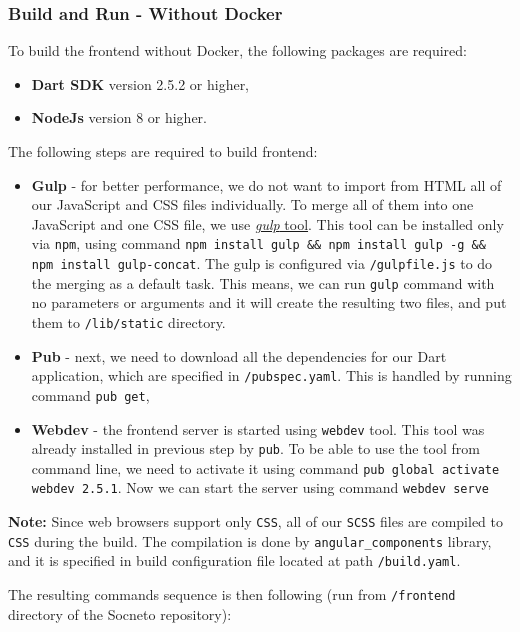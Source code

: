 \subsubsection {Build and Run - Without Docker}\label{section:frontend-build-no-docker}
To build the frontend without Docker, the following packages are required:
\begin{itemize}
    \item \textbf{Dart SDK} version 2.5.2 or higher,
    \item \textbf{NodeJs} version 8 or higher.
\end{itemize}
The following steps are required to build frontend:
\begin{itemize}
    \item \textbf{Gulp} - for better performance, we do not want to import from HTML all of our JavaScript and CSS files individually. To merge all of them into one JavaScript and one CSS file, we use \href{https://gulpjs.com/}{\textit{gulp} tool}. This tool can be installed only via \texttt{npm}, using command \texttt{npm install gulp \&\& npm install gulp -g \&\& npm install gulp-concat}. The gulp is configured via \texttt{/gulpfile.js} to do the merging as a default task. This means, we can run \texttt{gulp} command with no parameters or arguments and it will create the resulting two files, and put them to \texttt{/lib/static} directory.
    
    \item \textbf{Pub} - next, we need to download all the dependencies for our Dart application, which are specified in \texttt{/pubspec.yaml}. This is handled by running command \texttt{pub get},
    
    \item \textbf{Webdev} - the frontend server is started using \texttt{webdev} tool. This tool was already installed in previous step by \texttt{pub}. To be able to use the tool from command line, we need to activate it  using command \texttt{pub global activate webdev 2.5.1}. Now we can start the server using command \texttt{webdev serve}
\end{itemize}

\textbf{Note:} Since web browsers support only \texttt{CSS}, all of our \texttt{SCSS} files are compiled to \texttt{CSS} during the build. The compilation is done by \texttt{angular\_components} library, and it is specified in build configuration file located at path \texttt{/build.yaml}.

The resulting commands sequence is then following (run from \texttt{/frontend} directory of the Socneto repository):

